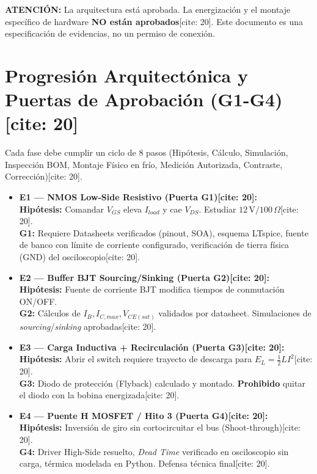 \documentclass[11pt, a4paper]{article}
\begin{document}
\begin{tcolorbox}[colback=red!5, colframe=red!70!black, title=\textbf{Hito 3: Especificación Incremental E1$\to$E4 y Puertas de Seguridad[cite: 20]}]
    \textbf{ATENCIÓN:} La arquitectura está aprobada. La energización y el montaje específico de hardware \textbf{NO están aprobados}[cite: 20]. Este documento es una especificación de evidencias, no un permiso de conexión.
\end{tcolorbox}

\section*{Progresión Arquitectónica y Puertas de Aprobación (G1-G4)[cite: 20]}
Cada fase debe cumplir un ciclo de 8 pasos (Hipótesis, Cálculo, Simulación, Inspección BOM, Montaje Físico en frío, Medición Autorizada, Contraste, Corrección)[cite: 20].

\begin{itemize}
    \setlength\itemsep{0.4em}
    \item \textbf{E1 — NMOS Low-Side Resistivo (Puerta G1)[cite: 20]:} \\
    \textbf{Hipótesis:} Comandar $V_{GS}$ eleva $I_{load}$ y cae $V_{DS}$. Estudiar $12\,\text{V} / 100\,\Omega$[cite: 20]. \\
    \textbf{G1:} Requiere Datasheets verificados (pinout, SOA), esquema LTspice, fuente de banco con límite de corriente configurado, verificación de tierra física (GND) del osciloscopio[cite: 20].
    
    \item \textbf{E2 — Buffer BJT Sourcing/Sinking (Puerta G2)[cite: 20]:} \\
    \textbf{Hipótesis:} Fuente de corriente BJT modifica tiempos de conmutación ON/OFF. \\
    \textbf{G2:} Cálculos de $I_B, I_{C,max}, V_{CE(sat)}$ validados por datasheet. Simulaciones de \textit{sourcing}/\textit{sinking} aprobadas[cite: 20].
    
    \item \textbf{E3 — Carga Inductiva + Recirculación (Puerta G3)[cite: 20]:} \\
    \textbf{Hipótesis:} Abrir el switch requiere trayecto de descarga para $E_L = \frac{1}{2} L I^2$[cite: 20]. \\
    \textbf{G3:} Diodo de protección (Flyback) calculado y montado. \textbf{Prohibido} quitar el diodo con la bobina energizada[cite: 20].
    
    \item \textbf{E4 — Puente H MOSFET / Hito 3 (Puerta G4)[cite: 20]:} \\
    \textbf{Hipótesis:} Inversión de giro sin cortocircuitar el bus (Shoot-through)[cite: 20]. \\
    \textbf{G4:} Driver High-Side resuelto, \textit{Dead Time} verificado en osciloscopio sin carga, térmica modelada en Python. Defensa técnica final[cite: 20].
\end{itemize}
\end{document}
